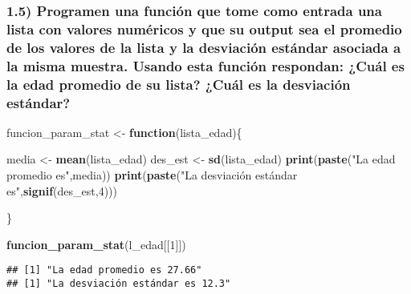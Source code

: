 \documentclass[
]{article}
\newenvironment{Shaded}{\begin{snugshade}}{\end{snugshade}}
\newcommand{\ControlFlowTok}[1]{\textcolor[rgb]{0.13,0.29,0.53}{\textbf{#1}}}
\newcommand{\DecValTok}[1]{\textcolor[rgb]{0.00,0.00,0.81}{#1}}
\newcommand{\FunctionTok}[1]{\textcolor[rgb]{0.13,0.29,0.53}{\textbf{#1}}}
\newcommand{\NormalTok}[1]{#1}
\newcommand{\OtherTok}[1]{\textcolor[rgb]{0.56,0.35,0.01}{#1}}
\newcommand{\StringTok}[1]{\textcolor[rgb]{0.31,0.60,0.02}{#1}}
\begin{document}
\hypertarget{programen-una-funciuxf3n-que-tome-como-entrada-una-lista-con-valores-numuxe9ricos-y-que-su-output-sea-el-promedio-de-los-valores-de-la-lista-y-la-desviaciuxf3n-estuxe1ndar-asociada-a-la-misma-muestra.-usando-esta-funciuxf3n-respondan-cuuxe1l-es-la-edad-promedio-de-su-lista-cuuxe1l-es-la-desviaciuxf3n-estuxe1ndar}{%
\subsubsection{1.5) Programen una función que tome como entrada una
lista con valores numéricos y que su output sea el promedio de los
valores de la lista y la desviación estándar asociada a la misma
muestra. Usando esta función respondan: ¿Cuál es la edad promedio de su
lista? ¿Cuál es la desviación
estándar?}\label{programen-una-funciuxf3n-que-tome-como-entrada-una-lista-con-valores-numuxe9ricos-y-que-su-output-sea-el-promedio-de-los-valores-de-la-lista-y-la-desviaciuxf3n-estuxe1ndar-asociada-a-la-misma-muestra.-usando-esta-funciuxf3n-respondan-cuuxe1l-es-la-edad-promedio-de-su-lista-cuuxe1l-es-la-desviaciuxf3n-estuxe1ndar}}

\begin{Shaded}
\begin{Highlighting}[]
\NormalTok{  funcion\_param\_stat }\OtherTok{\textless{}{-}} \ControlFlowTok{function}\NormalTok{(lista\_edad)\{}
    
\NormalTok{    media }\OtherTok{\textless{}{-}} \FunctionTok{mean}\NormalTok{(lista\_edad)}
\NormalTok{    des\_est }\OtherTok{\textless{}{-}} \FunctionTok{sd}\NormalTok{(lista\_edad)}
    \FunctionTok{print}\NormalTok{(}\FunctionTok{paste}\NormalTok{(}\StringTok{"La edad promedio es"}\NormalTok{,media))}
    \FunctionTok{print}\NormalTok{(}\FunctionTok{paste}\NormalTok{(}\StringTok{"La desviación estándar es"}\NormalTok{,}\FunctionTok{signif}\NormalTok{(des\_est,}\DecValTok{4}\NormalTok{)))}
    
\NormalTok{  \}}

\FunctionTok{funcion\_param\_stat}\NormalTok{(l\_edad[[}\DecValTok{1}\NormalTok{]])}
\end{Highlighting}
\end{Shaded}

\begin{verbatim}
## [1] "La edad promedio es 27.66"
## [1] "La desviación estándar es 12.3"
\end{verbatim}
\end{document}
